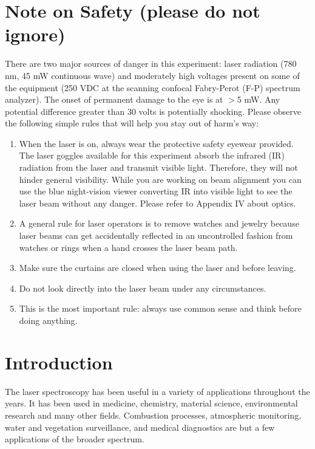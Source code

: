 \documentclass{../lab}
\begin{document}
\section{Note on Safety (please do not ignore)}

There are two major sources of danger in this experiment: laser radiation (780 nm, 45 mW continuous wave) and moderately high voltages present on some of the equipment (250 VDC at the scanning confocal Fabry-Perot (F-P) spectrum analyzer). The onset of permanent damage to the eye is at $>$5 mW. Any potential difference greater than 30 volts is potentially shocking. Please observe the following simple rules that will help you stay out of harm's way:

\begin{enumerate}
    \item When the laser is on, always wear the protective safety eyewear provided. The laser goggles available for this experiment absorb the infrared (IR) radiation from the laser and transmit visible light. Therefore, they will not hinder general visibility. While you are working on beam alignment you can use the blue night-vision viewer converting IR into visible light to see the laser beam without any danger. Please refer to Appendix IV about optics.

    \item A general rule for laser operators is to remove watches and jewelry because laser beams can get accidentally reflected in an uncontrolled fashion from watches or rings when a hand crosses the laser beam path.

    \item Make sure the curtains are closed when using the laser and before leaving.

    \item Do not look directly into the laser beam under any circumstances.

    \item This is the most important rule: always use common sense and think before doing anything.

\end{enumerate}

\section{Introduction}

The laser spectroscopy has been useful in a variety of applications throughout the years. It has been used in medicine, chemistry, material science, environmental research and many other fields. Combustion processes, atmospheric monitoring, water and vegetation surveillance, and medical diagnostics are but a few applications of the broader spectrum.
\end{document}
